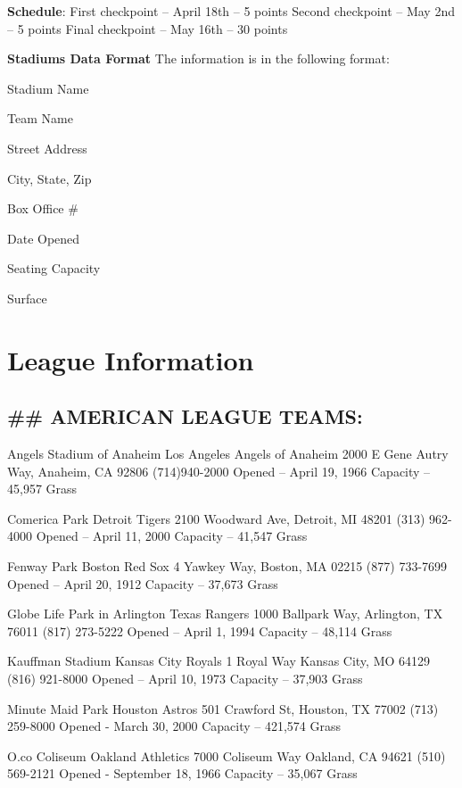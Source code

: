{\bfseries Schedule}\+: First checkpoint – April 18th – 5 points Second checkpoint – May 2nd – 5 points Final checkpoint – May 16th – 30 points

{\bfseries Stadiums Data Format} The information is in the following format\+:
\begin{DoxyItemize}
\item Stadium Name
\item Team Name
\item Street Address
\item City, State, Zip
\item Box Office \#
\item Date Opened
\item Seating Capacity
\item Surface
\end{DoxyItemize}

\section*{League Information}

\subsection*{\#\# A\+M\+E\+R\+I\+C\+AN L\+E\+A\+G\+UE T\+E\+A\+MS\+: }

Angels Stadium of Anaheim Los Angeles Angels of Anaheim 2000 E Gene Autry Way, Anaheim, CA 92806 (714)940-\/2000 Opened – April 19, 1966 Capacity – 45,957 Grass

Comerica Park Detroit Tigers 2100 Woodward Ave, Detroit, MI 48201 (313) 962-\/4000 Opened – April 11, 2000 Capacity – 41,547 Grass

Fenway Park Boston Red Sox 4 Yawkey Way, Boston, MA 02215 (877) 733-\/7699 Opened – April 20, 1912 Capacity – 37,673 Grass

Globe Life Park in Arlington Texas Rangers 1000 Ballpark Way, Arlington, TX 76011 (817) 273-\/5222 Opened – April 1, 1994 Capacity – 48,114 Grass

Kauffman Stadium Kansas City Royals 1 Royal Way Kansas City, MO 64129 (816) 921-\/8000 Opened – April 10, 1973 Capacity – 37,903 Grass

Minute Maid Park Houston Astros 501 Crawford St, Houston, TX 77002 (713) 259-\/8000 Opened -\/ March 30, 2000 Capacity – 421,574 Grass

O.\+co Coliseum Oakland Athletics 7000 Coliseum Way Oakland, CA 94621 (510) 569-\/2121 Opened -\/ September 18, 1966 Capacity – 35,067 Grass

